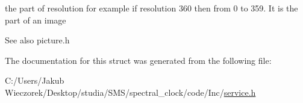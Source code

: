 the part of resolution for example if resolution 360 then from 0 to 359. It is the part of an image \begin{DoxySeeAlso}{See also}
picture.\+h 
\end{DoxySeeAlso}


The documentation for this struct was generated from the following file\+:\begin{DoxyCompactItemize}
\item 
C\+:/\+Users/\+Jakub Wieczorek/\+Desktop/studia/\+S\+M\+S/spectral\+\_\+clock/code/\+Inc/\mbox{\hyperlink{service_8h}{service.\+h}}\end{DoxyCompactItemize}
